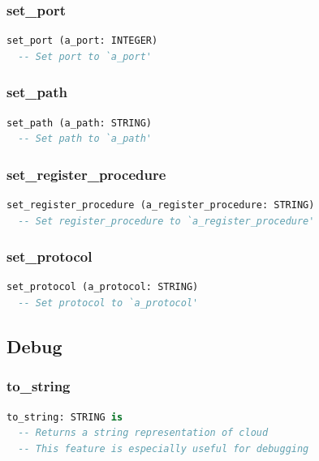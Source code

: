 \subsubsection{set\_port}

\begin{lstlisting}[language=Eiffel]
set_port (a_port: INTEGER)
  -- Set port to `a_port'
\end{lstlisting}

\subsubsection{set\_path}

\begin{lstlisting}[language=Eiffel]
set_path (a_path: STRING)
  -- Set path to `a_path'
\end{lstlisting}

\subsubsection{set\_register\_procedure}

\begin{lstlisting}[language=Eiffel]
set_register_procedure (a_register_procedure: STRING)
  -- Set register_procedure to `a_register_procedure'
\end{lstlisting}

\subsubsection{set\_protocol}

\begin{lstlisting}[language=Eiffel]
set_protocol (a_protocol: STRING)
  -- Set protocol to `a_protocol'
\end{lstlisting}

\subsection{Debug}
\label{sec:channel-cloud-debug}

\subsubsection{to\_string}

\begin{lstlisting}[language=Eiffel]
to_string: STRING is
  -- Returns a string representation of cloud
  -- This feature is especially useful for debugging
\end{lstlisting}


